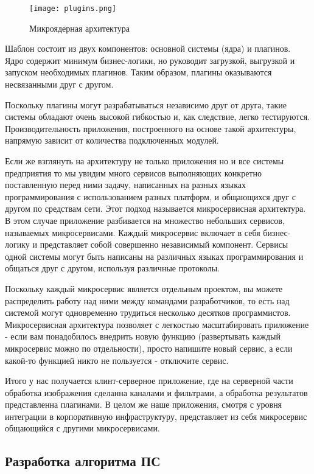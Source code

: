 \begin{figure}[ht] 
    \centering
    \texttt{[image: plugins.png]}  
    \caption{Микроядерная архитектура}
    \label{fig:arch_arch:plugins}
\end{figure}

Шаблон состоит из двух компонентов: основной системы (ядра) и плагинов. Ядро содержит минимум бизнес-логики, но руководит загрузкой, выгрузкой и запуском необходимых плагинов. Таким образом, плагины оказываются несвязанными друг с другом.

Поскольку плагины могут разрабатываться независимо друг от друга, такие системы обладают очень высокой гибкостью и, как следствие, легко тестируются. Производительность приложения, построенного на основе такой архитектуры, напрямую зависит от количества подключенных модулей.

Если же взглянуть на архитектуру не только приложения но и все системы предприятия то мы увидим много сервисов выполняющих конкретно поставленную перед ними задачу, написанных на разных языках программирования с использованием разных платформ, и общающихся друг с другом по средствам сети. Этот подход называется микросервисная архитектура. В этом случае приложение разбивается на множество небольших сервисов, называемых микросервисами. Каждый микросервис включает в себя бизнес-логику и представляет собой совершенно независимый компонент. Сервисы одной системы могут быть написаны на различных языках программирования и общаться друг с другом, используя различные протоколы.

Поскольку каждый микросервис является отдельным проектом, вы можете распределить работу над ними между командами разработчиков, то есть над системой могут одновременно трудиться несколько десятков программистов. Микросервисная архитектура позволяет с легкостью масштабировать приложение - если вам понадобилось внедрить новую функцию (развертывать каждый микросервис можно по отдельности), просто напишите новый сервис, а если какой-то функцией никто не пользуется - отключите сервис.

Итого у нас получается клинт-серверное приложение, где на серверной части обработка изображения сделанна каналами и фильтрами, а обработка результатов представленна плагинами. В целом же наше приложения, смотря с уровня интеграции в корпоративную инфраструктуру, представляет из себя микросервис общающийся с другими микросервисами.

\subsection{Разработка  алгоритма ПС}
\label{sec:arch:algorythm}

